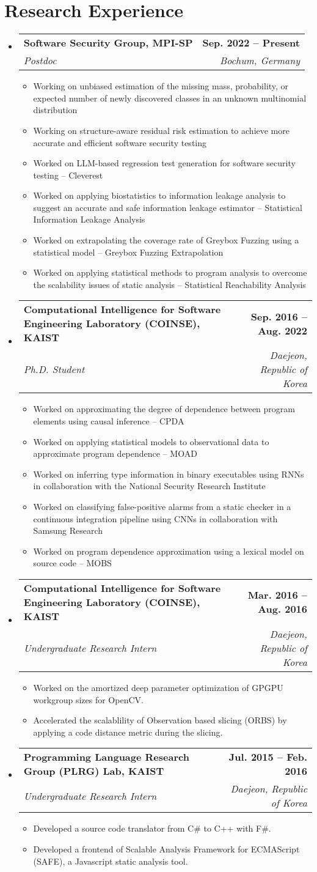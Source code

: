\documentclass[letterpaper,11pt]{article}
\makeatletter
\newcommand{\resumeItem}[1]{
  \item\small{
    {#1 \vspace{-2pt}}
  }
}
\newcommand{\resumeSubheading}[4]{
  \vspace{-2pt}\item
    \begin{tabular*}{1.0\textwidth}[t]{l@{\extracolsep{\fill}}r}
      \textbf{#1} & \textbf{\small #2} \\
      \textit{\small#3} & \textit{\small #4} \\
    \end{tabular*}\vspace{-7pt}
}
\newcommand{\resumeSubHeadingListStart}{\begin{itemize}[leftmargin=0.0in, label={}]}
\newcommand{\resumeSubHeadingListEnd}{\end{itemize}}
\newcommand{\resumeItemListStart}{\begin{itemize}}
\newcommand{\resumeItemListEnd}{\end{itemize}\vspace{-5pt}}
\makeatother
\begin{document}
\section{Research Experience}
\resumeSubHeadingListStart

\resumeSubheading
{Software Security Group, MPI-SP}{Sep. 2022 -- Present}
{Postdoc}{Bochum, Germany}
\resumeItemListStart
\resumeItem{Working on unbiased estimation of the missing mass, probability, or expected number of newly discovered classes in an unknown multinomial distribution}
\resumeItem{Working on structure-aware residual risk estimation to achieve more accurate and efficient software security testing}
\resumeItem{Worked on LLM-based regression test generation for software security testing -- Cleverest}
\resumeItem{Worked on applying biostatistics to information leakage analysis to suggest an accurate and safe information leakage estimator -- Statistical Information Leakage Analysis}
\resumeItem{Worked on extrapolating the coverage rate of Greybox Fuzzing using a statistical model -- Greybox Fuzzing Extrapolation}
\resumeItem{Worked on applying statistical methods to program analysis to overcome the scalability issues of static analysis -- Statistical Reachability Analysis}
\resumeItemListEnd

\resumeSubheading
{Computational Intelligence for Software Engineering Laboratory (COINSE), KAIST}{Sep. 2016 -- Aug. 2022}
{Ph.D. Student}{Daejeon, Republic of Korea}
\resumeItemListStart
\resumeItem{Worked on approximating the degree of dependence between program elements using causal inference -- CPDA}
\resumeItem{Worked on applying statistical models to observational data to approximate program dependence -- MOAD}
\resumeItem{Worked on inferring type information in binary executables using RNNs in collaboration with the National Security Research Institute}
\resumeItem{Worked on classifying false-positive alarms from a static checker in a continuous integration pipeline using CNNs in collaboration with Samsung Research}
\resumeItem{Worked on program dependence approximation using a lexical model on source code -- MOBS}
\resumeItemListEnd

\resumeSubheading
{Computational Intelligence for Software Engineering Laboratory (COINSE), KAIST}{Mar. 2016 -- Aug. 2016}
{Undergraduate Research Intern}{Daejeon, Republic of Korea}
\resumeItemListStart
\resumeItem{Worked on the amortized deep parameter optimization of GPGPU workgroup sizes for OpenCV.}
\resumeItem{Accelerated the scalablility of Observation based slicing (ORBS) by applying a code distance metric during the slicing.}
\resumeItemListEnd

\resumeSubheading
{Programming Language Research Group (PLRG) Lab, KAIST}{Jul. 2015 -- Feb. 2016}
{Undergraduate Research Intern}{Daejeon, Republic of Korea}
\resumeItemListStart
\resumeItem{Developed a source code translator from C\# to C++ with F\#.}
\resumeItem{Developed a frontend of Scalable Analysis Framework for ECMAScript (SAFE), a Javascript static analysis tool.}
\resumeItemListEnd

\resumeSubHeadingListEnd
\end{document}
